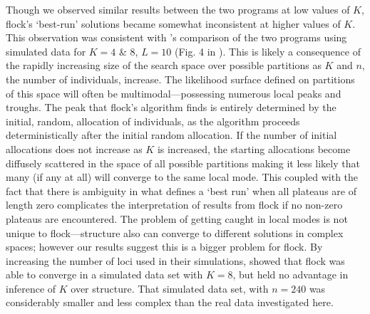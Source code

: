 Though we observed similar results
between the two programs at low values of $K$, {\sc flock}'s `best-run' solutions became somewhat inconsistent at higher values of $K$.
This observation was consistent with \citet{Duc&Tur2012}'s comparison of the 
two programs using simulated data 
for $K=4$ \& 8, $L=10$ (Fig. 4 in \citet{Duc&Tur2012}). 
This is likely a consequence of the rapidly increasing size of the search space over possible 
partitions as $K$ and $n$, the number of individuals, increase. 
The likelihood surface defined on partitions of this space will often
be multimodal---possessing numerous local peaks and troughs.
The peak that  {\sc flock}'s algorithm finds is entirely determined by the initial, random, allocation of 
individuals, as the algorithm proceeds deterministically after the initial random allocation.
If the number of initial allocations does not increase
as $K$ is increased, the starting allocations become diffusely scattered in the space of all
possible partitions making it less likely that many (if any at all) will converge to the same local mode. 
This coupled with the fact that there is 
ambiguity in what defines a `best run' when all plateaus are of length zero complicates the interpretation
of results from {\sc flock} if no non-zero plateaus are encountered. The problem of getting 
caught in local modes is not unique to {\sc flock}---{\sc structure} also can converge to 
different solutions in complex spaces; however our results suggest this is a bigger problem for {\sc flock}.
By increasing the number of loci used in their simulations, \citet{Duc&Tur2012} showed  that 
{\sc flock} was able to converge in a simulated data set with $K=8$, but held no advantage in inference of $K$ over {\sc structure}. That simulated data set, with $n=240$ was considerably smaller and less complex than the real data investigated here.

